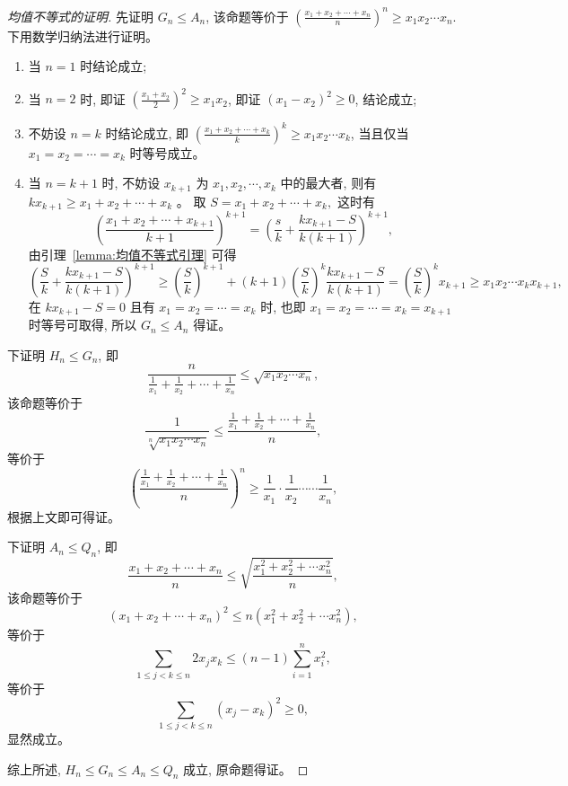 \begin{proof}[均值不等式的证明]
  先证明 $G_{n} \leq A_{n}$, 该命题等价于 $\left(\frac{x_{1}+x_{2}+\cdots+x_{n}}{n}\right)^{n} \geq x_{1} x_{2} \cdots x_{n}$. 下用数学归纳法进行证明。
  \begin{enumerate}
    \item 当 $n=1$ 时结论成立;
    \item 当 $n=2$ 时, 即证 $\left(\frac{x_{1}+x_{2}}{2}\right)^{2} \geq x_{1} x_{2}$, 即证 $\left(x_{1}-x_{2}\right)^{2} \geq 0$, 结论成立;
    \item 不妨设 $n=k$ 时结论成立, 即 $\left(\frac{x_{1}+x_{2}+\cdots+x_{k}}{k}\right)^{k} \geq x_{1} x_{2} \cdots x_{k}$, 当且仅当 $x_{1}=x_{2}=\cdots=x_{k}$ 时等号成立。
    \item 当 $n=k+1$ 时, 不妨设 $x_{k+1}$ 为 $x_{1}, x_{2}, \cdots, x_{k}$ 中的最大者, 则有 $k x_{k+1} \geq x_{1}+x_{2}+\cdots+x_{k}$ 。 取 $S=x_{1}+x_{2}+\cdots+x_{k},$ 这时有 
    \[
      \left(\frac{x_{1}+x_{2}+\cdots+x_{k+1}}{k+1}\right)^{k+1}=\left(\frac{s}{k}+\right. \left.\frac{k x_{k+1}-S}{k(k+1)}\right)^{k+1},
    \] 由引理~\ref{lemma:均值不等式引理} 可得 
    \[
      \left(\frac{S}{k}+\frac{k x_{k+1}-S}{k(k+1)}\right)^{k+1} \geq\left(\frac{S}{k}\right)^{k+1}+(k+1)\left(\frac{S}{k}\right)^{k} \frac{k x_{k+1}-S}{k(k+1)} = \left(\frac{S}{k}\right)^{k} x_{k+1} \geq x_{1} x_{2} \cdots x_{k} x_{k+1}, 
    \]
    在 $k x_{k+1}-S=0$ 且有 $x_{1}=x_{2}=\cdots=x_{k}$ 时, 也即 $x_{1}=x_{2}=\cdots=x_{k}=x_{k+1}$ 时等号可取得, 所以 $G_{n} \leq A_{n}$ 得证。
  \end{enumerate}

  下证明 $H_{n} \leq G_{n}$, 即 \[\frac{n}{\frac{1}{x_{1}}+\frac{1}{x_{2}}+\cdots+\frac{1}{x_{n}}} \leq \sqrt{x_{1} x_{2} \cdots x_{n}},\] 该命题等价于 \[\frac{1}{\sqrt[n]{x_{1} x_{2} \cdots x_{n}}} \leq \frac{\frac{1}{x_{1}}+\frac{1}{x_{2}}+\cdots+\frac{1}{x_{n}}}{n},\] 等价于 \[\left(\frac{\frac{1}{x_{1}}+\frac{1}{x_{2}}+\cdots+\frac{1}{x_{n}}}{n}\right)^{n} \geq \frac{1}{x_{1}} \cdot \frac{1}{x_{2}} \cdots \cdots \frac{1}{x_{n}},\]根据上文即可得证。 
  
  下证明 $A_{n} \leq Q_{n}$, 即 \[\frac{x_{1}+x_{2}+\cdots+x_{n}}{n} \leq \sqrt{\frac{x_{1}^{2}+x_{2}^{2}+\cdots x_{n}^{2}}{n}},\] 该命题等价于 \[\left(x_{1}+x_{2}+\cdots+x_{n}\right)^{2} \leq n\left(x_{1}^{2}+x_{2}^{2}+\cdots x_{n}^{2}\right),\] 等价于 \[\sum_{1 \leq j<k \leq n} 2 x_{j} x_{k} \leq(n-1) \sum_{i=1}^{n} x_{i}^{2},\] 等价于 \[\sum_{1 \leq j<k \leq n}\left(x_{j}-x_{k}\right)^{2} \geq 0,\]显然成立。

  综上所述, $H_{n} \leq G_{n} \leq A_{n} \leq Q_{n}$ 成立, 原命题得证。
\end{proof}


